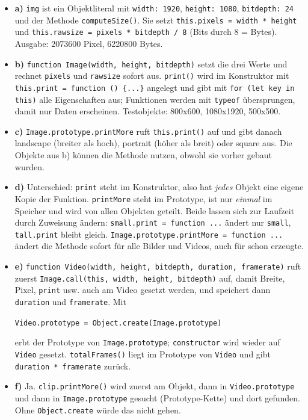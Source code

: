 \documentclass[11pt,a4paper]{article}
\begin{document}
\begin{itemize}
  \item \textbf{a)} \texttt{img} ist ein Objektliteral mit
    \texttt{width: 1920}, \texttt{height: 1080}, \texttt{bitdepth: 24} und
    der Methode \texttt{computeSize()}. Sie setzt
    \texttt{this.pixels = width * height} und
    \texttt{this.rawsize = pixels * bitdepth / 8} (Bits durch 8 = Bytes).
    Ausgabe: 2073600 Pixel, 6220800 Bytes.
  \item \textbf{b)} \texttt{function Image(width, height, bitdepth)} setzt
    die drei Werte und rechnet \texttt{pixels} und \texttt{rawsize} sofort
    aus. \texttt{print()} wird im Konstruktor mit
    \texttt{this.print = function () \{...\}} angelegt und gibt mit
    \texttt{for (let key in this)} alle Eigenschaften aus; Funktionen werden
    mit \texttt{typeof} übersprungen, damit nur Daten erscheinen.
    Testobjekte: 800x600, 1080x1920, 500x500.
  \item \textbf{c)} \texttt{Image.prototype.printMore} ruft
    \texttt{this.print()} auf und gibt danach \glqq landscape\grqq{}
    (breiter als hoch), \glqq portrait\grqq{} (höher als breit) oder
    \glqq square\grqq{} aus. Die Objekte aus b) können die Methode nutzen,
    obwohl sie vorher gebaut wurden.
  \item \textbf{d)} Unterschied: \texttt{print} steht im Konstruktor, also
    hat \emph{jedes} Objekt eine eigene Kopie der Funktion.
    \texttt{printMore} steht im Prototype, ist nur \emph{einmal} im
    Speicher und wird von allen Objekten geteilt. Beide lassen sich zur
    Laufzeit durch Zuweisung ändern: \texttt{small.print = function ...}
    ändert nur \texttt{small}, \texttt{tall.print} bleibt gleich.
    \texttt{Image.prototype.printMore = function ...} ändert die Methode
    sofort für alle Bilder und Videos, auch für schon erzeugte.
  \item \textbf{e)} \texttt{function Video(width, height, bitdepth,
    duration, framerate)} ruft zuerst \texttt{Image.call(this, width,
    height, bitdepth)} auf, damit Breite, Pixel, \texttt{print} usw. auch am
    Video gesetzt werden, und speichert dann \texttt{duration} und
    \texttt{framerate}. Mit
    \begin{center}\texttt{Video.prototype = Object.create(Image.prototype)}\end{center}
    erbt der Prototype von
    \texttt{Image.prototype}; \texttt{constructor} wird wieder auf
    \texttt{Video} gesetzt. \texttt{totalFrames()} liegt im Prototype von
    \texttt{Video} und gibt \texttt{duration * framerate} zurück.
  \item \textbf{f)} Ja. \texttt{clip.printMore()} wird zuerst am Objekt,
    dann in \texttt{Video.prototype} und dann in \texttt{Image.prototype}
    gesucht (Prototype-Kette) und dort gefunden. Ohne
    \texttt{Object.create} würde das nicht gehen.
\end{itemize}
\end{document}
